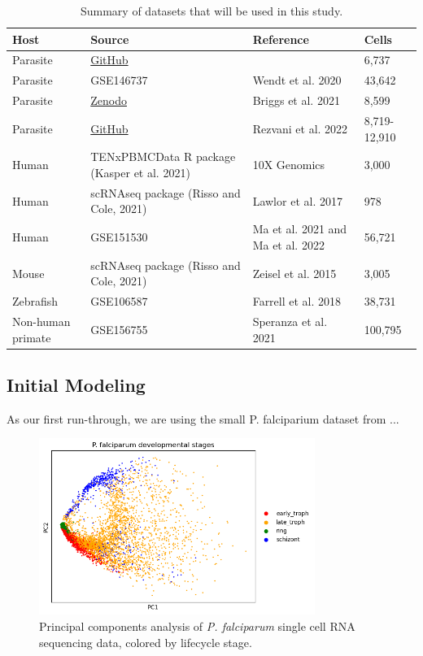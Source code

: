 \documentclass{article}
\begin{document}
\begin{table}[!h]
  \caption{Summary of datasets that will be used in this study.}
  \label{tab:summary}
  \centering
  \begin{tabularx}{\textwidth}{lXll}
    \toprule
    \textbf{Host} & \textbf{Source} & \textbf{Reference} & \textbf{Cells} \\
    \midrule
    Parasite & \href{https://github.com/vhowick/MalariaCellAtlas/tree/master/Expression_Matrices10X/pf10xIDC}{GitHub} & \citet{howickMalariaCellAtlas2019} & 6,737 \\
    \midrule
    Parasite & GSE146737 & Wendt et al. 2020 & 43,642 \\
    \midrule
    Parasite & \href{https://zenodo.org/record/5163554\#.YQvu2ZNKjUo}{Zenodo} & Briggs et al. 2021 & 8,599 \\
    \midrule
    Parasite & \href{https://github.com/umbibio/scBabesiaAtlases}{GitHub} & Rezvani et al. 2022 & 8,719-12,910 \\
    \midrule
    Human & TENxPBMCData R package (Kasper et al. 2021) & 10X Genomics & 3,000 \\
    \midrule
    Human & scRNAseq package (Risso and Cole, 2021) & Lawlor et al. 2017 & 978 \\
    \midrule
    Human & GSE151530 & Ma et al. 2021 and Ma et al. 2022 & 56,721 \\
    \midrule
    Mouse & scRNAseq package (Risso and Cole, 2021) & Zeisel et al. 2015 & 3,005 \\
    \midrule
    Zebrafish & GSE106587 & Farrell et al. 2018 & 38,731 \\
    \midrule
    Non-human primate & GSE156755 & Speranza et al. 2021 & 100,795 \\
    \bottomrule
  \end{tabularx}
\end{table}

\subsection{Initial Modeling}

As our first run-through, we are using the small P. falciparium dataset from ...

\begin{figure}[H]
  \centering
  \includegraphics[width=0.8\textwidth]{figures/pca_Pf.png}
  \caption{Principal components analysis of \textit{P. falciparum} single cell RNA sequencing data, colored by lifecycle stage.}
\end{figure}
\end{document}
